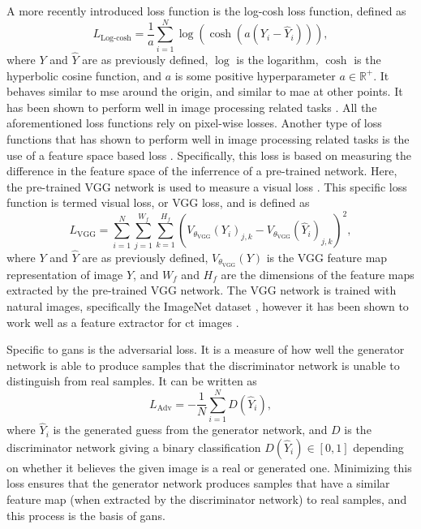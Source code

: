 A more recently introduced loss function is the log-cosh loss function, defined as \cite{chen2019log}
\begin{equation}
    \label{eq:losslogcosh}
    L_{\text{Log-cosh}} = \frac{1}{a} \sum_{i=1}^N \log ( \cosh ( a ( Y_i - \hat{Y}_i))),
\end{equation}
where $Y$ and $\hat{Y}$ are as previously defined, $\log$ is the logarithm, $\cosh$ is the hyperbolic cosine function, and $a$ is some positive hyperparameter $a \in \mathbb{R}^+$. It behaves similar to \acrshort{mse} around the origin, and similar to \acrshort{mae} at other points. It has been shown to perform well in image processing related tasks \cite{7797130}.
All the aforementioned loss functions rely on pixel-wise losses. Another type of loss functions that has shown to perform well in image processing related tasks is the use of a feature space based loss \cite{vggloss}. Specifically, this loss is based on measuring the difference in the feature space of the inferrence of a pre-trained network. Here, the pre-trained VGG network is used to measure a visual loss \cite{simonyan2015deep}. This specific loss function is termed visual loss, or VGG loss, and is defined as \cite{vggloss,liu2020tomogan}
\begin{equation}
    \label{eq:lossvgg}
    L_{\text{VGG}} = \sum_{i=1}^{N} \sum_{j=1}^{W_f} \sum_{k=1}^{H_f} \left(V_{\theta_{\text{VGG}}} (Y_i)_{j,k} - V_{\theta_{\text{VGG}}} (\hat{Y}_i)_{j,k} \right)^2,
\end{equation}
where $Y$ and $\hat{Y}$ are as previously defined, $V_{\theta_{\text{VGG}}}(Y)$ is the VGG feature map representation of image $Y$, and $W_f$ and $H_f$ are the dimensions of the feature maps extracted by the pre-trained VGG network. The VGG network is trained with natural images, specifically the ImageNet dataset \cite{deng2009imagenet}, however it has been shown to work well as a feature extractor for \acrshort{ct} images \cite{8340157}. 

Specific to \acrshort{gan}s is the adversarial loss. It is a measure of how well the generator network is able to produce samples that the discriminator network is unable to distinguish from real samples. It can be written as \cite{liu2020tomogan}
\begin{equation}
    \label{eq:lossadv}
    L_{\text{Adv}} = -\frac{1}{N} \sum_{i=1}^{N} D\left(  \hat{Y}_i \right),
\end{equation}
where $\hat{Y}_i$ is the generated guess from the generator network, and $D$ is the discriminator network giving a binary classification $D\left(\hat{Y}_i \right) \in [0,1]$ depending on whether it believes the given image is a real or generated one. Minimizing this loss ensures that the generator network produces samples that have a similar feature map (when extracted by the discriminator network) to real samples, and this process is the basis of \acrshort{gan}s. 


